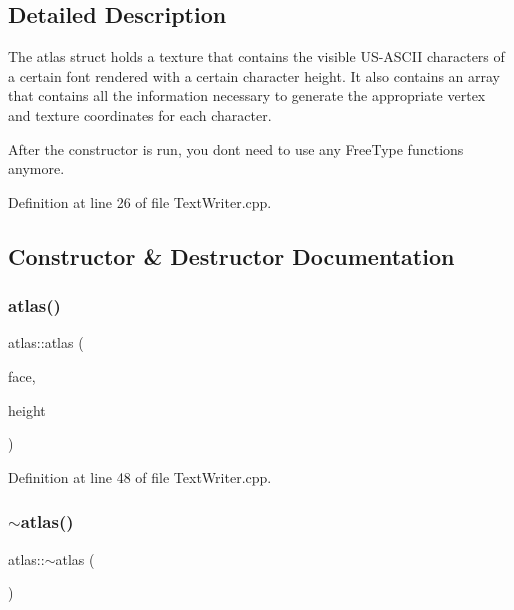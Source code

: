 \subsection{Detailed Description}
The atlas struct holds a texture that contains the visible U\+S-\/\+A\+S\+C\+II characters of a certain font rendered with a certain character height. It also contains an array that contains all the information necessary to generate the appropriate vertex and texture coordinates for each character.

After the constructor is run, you don\textquotesingle{}t need to use any Free\+Type functions anymore. 

Definition at line 26 of file Text\+Writer.\+cpp.



\subsection{Constructor \& Destructor Documentation}
\mbox{\label{structatlas_acff7316647fa402c573edcf150eea8f6}} 
\subsubsection{\texorpdfstring{atlas()}{atlas()}}
{\footnotesize\ttfamily atlas\+::atlas (\begin{DoxyParamCaption}\item[{F\+T\+\_\+\+Face}]{face,  }\item[{int}]{height }\end{DoxyParamCaption})\hspace{0.3cm}{\ttfamily [inline]}}



Definition at line 48 of file Text\+Writer.\+cpp.

\mbox{\label{structatlas_acdf57e34cdfdf4ebb8c6642138db3783}} 
\subsubsection{\texorpdfstring{$\sim$atlas()}{~atlas()}}
{\footnotesize\ttfamily atlas\+::$\sim$atlas (\begin{DoxyParamCaption}{ }\end{DoxyParamCaption})\hspace{0.3cm}{\ttfamily [inline]}}



